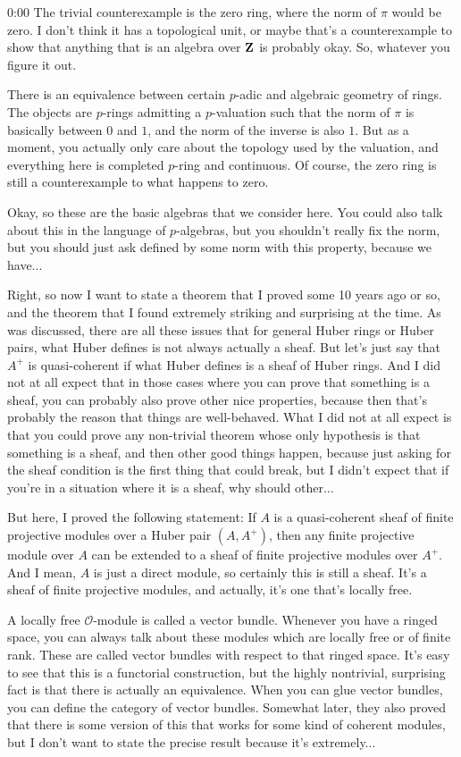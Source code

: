 \begin{unfinished}{0:00}
The trivial counterexample is the zero ring, where the norm of $\pi$ would be zero. I don't think it has a topological unit, or maybe that's a counterexample to show that anything that is an algebra over $\mathbf Z$ is probably okay. So, whatever you figure it out.

There is an equivalence between certain $p$-adic and algebraic geometry of rings. The objects are $p$-rings admitting a $p$-valuation such that the norm of $\pi$ is basically between $0$ and $1$, and the norm of the inverse is also $1$. But as a moment, you actually only care about the topology used by the valuation, and everything here is completed $p$-ring and continuous. Of course, the zero ring is still a counterexample to what happens to zero.

Okay, so these are the basic algebras that we consider here. You could also talk about this in the language of $p$-algebras, but you shouldn't really fix the norm, but you should just ask defined by some norm with this property, because we have...

Right, so now I want to state a theorem that I proved some 10 years ago or so, and the theorem that I found extremely striking and surprising at the time. As was discussed, there are all these issues that for general Huber rings or Huber pairs, what Huber defines is not always actually a sheaf. But let's just say that $A^+$ is quasi-coherent if what Huber defines is a sheaf of Huber rings. And I did not at all expect that in those cases where you can prove that something is a sheaf, you can probably also prove other nice properties, because then that's probably the reason that things are well-behaved. What I did not at all expect is that you could prove any non-trivial theorem whose only hypothesis is that something is a sheaf, and then other good things happen, because just asking for the sheaf condition is the first thing that could break, but I didn't expect that if you're in a situation where it is a sheaf, why should other...

But here, I proved the following statement: If $A$ is a quasi-coherent sheaf of finite projective modules over a Huber pair $(A,A^+)$, then any finite projective module over $A$ can be extended to a sheaf of finite projective modules over $A^+$. And I mean, $A$ is just a direct module, so certainly this is still a sheaf. It's a sheaf of finite projective modules, and actually, it's one that's locally free.

A locally free $\mathcal{O}$-module is called a vector bundle. Whenever you have a ringed space, you can always talk about these modules which are locally free or of finite rank. These are called vector bundles with respect to that ringed space. It's easy to see that this is a functorial construction, but the highly nontrivial, surprising fact is that there is actually an equivalence. When you can glue vector bundles, you can define the category of vector bundles. Somewhat later, they also proved that there is some version of this that works for some kind of coherent modules, but I don't want to state the precise result because it's extremely...


\end{unfinished}
